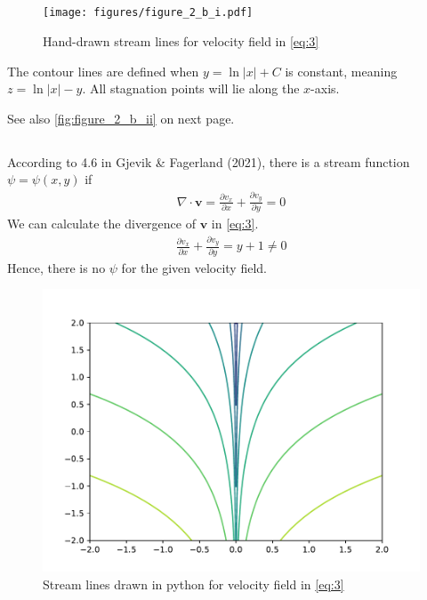 \documentclass[a4paper,10pt,english]{article}
\begin{document}
\newpage
\subsection{}
\begin{figure}[h]
    \centering
    \texttt{[image: figures/figure\_2\_b\_i.pdf]}
    \caption{Hand-drawn stream lines for velocity field in \eqref{eq:3}}
    \label{fig:figure_2_b_i}
\end{figure}
The contour lines are defined when $y = \ln|x| + C$ is constant, meaning $z = \ln|x| - y$. All stagnation points will lie along the $x$-axis. 



See also \autoref{fig:figure_2_b_ii}  on next page.

\subsection{}
According to 4.6 in Gjevik \& Fagerland (2021), there is a stream function $\psi=\psi(x, y)$ if 
\begin{align}
    \nabla \cdot \bm{v} 
    = \frac{\partial v_x}{\partial x} + \frac{\partial v_y}{\partial y}
    = 0
\end{align}
We can calculate the divergence of $\bm{v}$ in \eqref{eq:3}.
\begin{align*}
    \frac{\partial v_x}{\partial x} + \frac{\partial v_y}{\partial y}
    = y + 1 \neq 0
\end{align*}
Hence, there is no $\psi$ for the given velocity field. 

\begin{figure}[h]
    \centering
    \includegraphics[scale=0.7]{figures/figure_2_b_ii.pdf}
    \caption{Stream lines drawn in python for velocity field in \eqref{eq:3}}
    \label{fig:figure_2_b_ii}
\end{figure}
\end{document}
